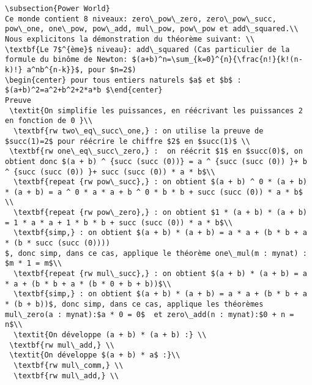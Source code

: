 \begin{verbatim}
\subsection{Power World}
Ce monde contient 8 niveaux: zero\_pow\_zero, zero\_pow\_succ, pow\_one, one\_pow, pow\_add, mul\_pow, pow\_pow et add\_squared.\\ 
Nous explicitons la démonstration du théorème suivant: \\
\textbf{Le 7$^{ème}$ niveau}: add\_squared (Cas particulier de la formule du binôme de Newton: $(a+b)^n=\sum_{k=0}^{n}{\frac{n!}{k!(n-k)!} a^nb^{n-k}}$, pour $n=2$)
\begin{center} pour tous entiers naturels $a$ et $b$ : $(a+b)^2=a^2+b^2+2*a*b $\end{center}
Preuve
 \textit{On simplifie les puissances, en réécrivant les puissances 2 en fonction de 0 }\\
  \textbf{rw two\_eq\_succ\_one,} : on utilise la preuve de $succ(1)=2$ pour réécrire le chiffre $2$ en $succ(1)$ \\
 \textbf{rw one\_eq\_succ\_zero,} :  on réécrit $1$ en $succ(0)$, on obtient donc $(a + b) ^ {succ (succ (0))} = a ^ {succ (succ (0)) }+ b ^ {succ (succ (0)) }+ succ (succ (0)) * a * b$\\
  \textbf{repeat {rw pow\_succ},} : on obtient $(a + b) ^ 0 * (a + b) * (a + b) = a ^ 0 * a * a + b ^ 0 * b * b + succ (succ (0)) * a * b$ \\
  \textbf{repeat {rw pow\_zero},} : on obtient $1 * (a + b) * (a + b) = 1 * a * a + 1 * b * b + succ (succ (0)) * a * b$\\
  \textbf{simp,} : on obtient $(a + b) * (a + b) = a * a + (b * b + a * (b * succ (succ (0))))
$, donc simp, dans ce cas, applique le théorème one\_mul(m : mynat) : $m * 1 = m$\\ 
  \textbf{repeat {rw mul\_succ},} : on obtient $(a + b) * (a + b) = a * a + (b * b + a * (b * 0 + b + b))$\\
  \textbf{simp,} : on obtient $(a + b) * (a + b) = a * a + (b * b + a * (b + b))$, donc simp, dans ce cas, applique les théorèmes mul\_zero(a : mynat):$a * 0 = 0$  et zero\_add(n : mynat):$0 + n = n$\\
  \textit{On développe (a + b) * (a + b) :} \\
 \textbf{rw mul\_add,} \\
 \textit{On développe $(a + b) * a$ :}\\
  \textbf{rw mul\_comm,} \\
  \textbf{rw mul\_add,} \\

\end{verbatim}
